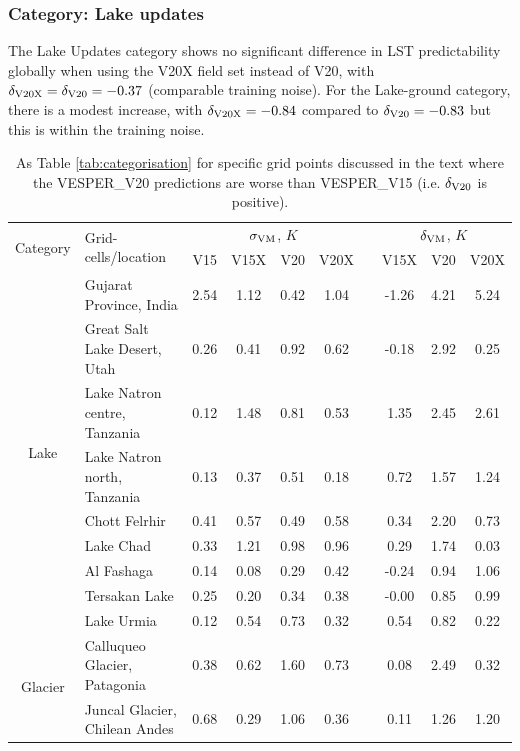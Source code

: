 \documentclass[hess, twostagejnl]{copernicus}
\begin{document}
\subsubsection{Category: Lake updates}\label{sec:lake2}
The Lake Updates category shows no significant difference in LST predictability globally when using the V20X field set instead of V20, with $\delta_{\rm V20X} = \delta_{\rm V20} = -0.37$ (comparable training noise). For the Lake-ground category, there is a modest increase, with $\delta_{\rm V20X} = -0.84$ compared to   $\delta_{\rm V20} = -0.83$ but this is within the training noise.
\begin{table}
	\begin{tabular}{clcccccccc}
		\toprule
		\multirow{2}{*}{Category} & \multirow{2}{*}{Grid-cells/location} & 	\multicolumn{4}{c}{$\sigma_{\rm VM}$, $K$} &&\multicolumn{3}{c}{$\delta_{\rm VM}$, $K$} \\  
		&&V15  & V15X & V20 & V20X && V15X &V20 & V20X  \\
		\hline 
		\multirow{9}{*}{Lake}&Gujarat Province, India& 2.54 &1.12 &0.42 &1.04 && -1.26 &4.21& 5.24 \\
		&Great Salt Lake Desert, Utah&0.26 &0.41 &0.92 &0.62 && -0.18 &2.92 &0.25\\
		&Lake Natron centre, Tanzania&0.12 &1.48 &0.81& 0.53 && 1.35& 2.45& 2.61 \\
		&Lake Natron north, Tanzania&0.13 &0.37 &0.51& 0.18 && 0.72 &1.57 &1.24 \\
		&Chott Felrhir&0.41 &0.57& 0.49& 0.58 && 0.34 &2.20& 0.73 \\
		&Lake Chad&0.33 &1.21 &0.98 &0.96 && 0.29 &1.74 &0.03\\
		&Al Fashaga&0.14 &0.08 &0.29 &0.42 && -0.24& 0.94 &1.06 \\
		&Tersakan Lake&0.25 &0.20& 0.34 &0.38 && -0.00 &0.85 &0.99 \\
		&Lake Urmia&0.12& 0.54 &0.73 &0.32 && 0.54 &0.82 &0.22 \\
		\hline 
		\multirow{2}{*}{Glacier}&Calluqueo Glacier, Patagonia&0.38 &0.62& 1.60 &0.73 && 0.08& 2.49 &0.32\\
		&Juncal Glacier, Chilean Andes &0.68& 0.29& 1.06& 0.36 && 0.11 &1.26 &1.20 \\
		\bottomrule
	\end{tabular}
	\caption{As Table \ref{tab:categorisation} for specific grid points discussed in the text where the VESPER\_V20 predictions are worse than VESPER\_V15 (i.e. $\delta_{\rm V20}$ is positive).}
	\label{tab:categorisation2}
\end{table}
\end{document}
